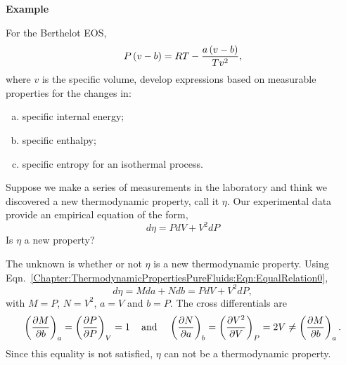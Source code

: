    \begin{MyExample}{\begin{center}{\bf Example}\end{center}}
     \begin{example}\label{Chapter:ThermodynamicPropertiesPureFluids:Example4} \citep{Balmer_Book}
         For the Berthelot EOS,
           \begin{displaymath}
              P\left(v-b\right) = RT - \frc{a\left(v-b\right)}{Tv^{2}},
           \end{displaymath}
         where $v$ is the specific volume, develop expressions based on measurable properties for the changes in:
         \begin{enumerate}[a)]
            \item specific internal energy;
            \item specific enthalpy;
            \item specific entropy for an isothermal process.
         \end{enumerate}

         Suppose we make a series of measurements in the laboratory and think we discovered a new thermodynamic property, call it $\eta$. Our experimental data provide an empirical equation of the form,
          \begin{displaymath}
             d\eta = PdV + V^{2}dP
          \end{displaymath}
          Is $\eta$ a new property?
     \end{example}

        The unknown is whether or not $\eta$ is a new thermodynamic property. Using Eqn.~\ref{Chapter:ThermodynamicPropertiesPureFluids:Eqn:EqualRelation0},
        \begin{displaymath}
            d\eta = Mda + Ndb = PdV + V^{2}dP,
        \end{displaymath}
        with $M=P$, $N=V^{2}$, $a=V$ and $b=P$. The cross differentials are
        \begin{displaymath}
            \Partial[M]{b}{a} = \Partial[P]{P}{V} = 1\;\;\;\text{ and }\;\;\; \Partial[N]{a}{b} = \Partial[V^{2}]{V}{P} = 2V \ne \Partial[M]{b}{a}.
        \end{displaymath}
         Since this equality is not satisfied, $\eta$ can not be a thermodynamic property.
   \end{MyExample}
   



